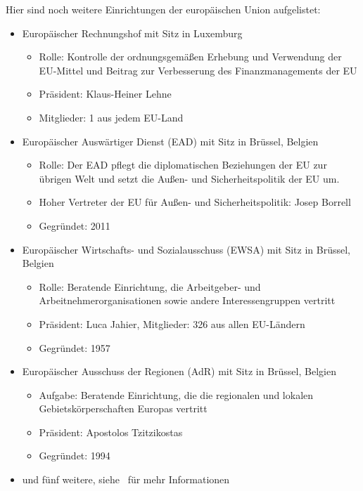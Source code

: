 Hier sind noch weitere Einrichtungen der europäischen Union aufgelistet:
\begin{itemize}
  \item Europäischer Rechnungshof mit Sitz in Luxemburg
  \begin{itemize}
    \item Rolle: Kontrolle der ordnungsgemäßen Erhebung und Verwendung der EU-Mittel und Beitrag zur Verbesserung des Finanzmanagements der EU
    \item Präsident: Klaus-Heiner Lehne
    \item Mitglieder: 1 aus jedem EU-Land
  \end{itemize}
  \item Europäischer Auswärtiger Dienst (EAD) mit Sitz in Brüssel, Belgien
  \begin{itemize}
    \item Rolle: Der EAD pflegt die diplomatischen Beziehungen der EU zur übrigen Welt und setzt die Außen- und Sicherheitspolitik der EU um.
    \item Hoher Vertreter der EU für Außen- und Sicherheitspolitik: Josep Borrell
    \item Gegründet: 2011
  \end{itemize}
  \item Europäischer Wirtschafts- und Sozialausschuss (EWSA) mit Sitz in Brüssel, Belgien
  \begin{itemize}
    \item Rolle: Beratende Einrichtung, die Arbeitgeber- und Arbeitnehmerorganisationen sowie andere Interessengruppen vertritt
    \item Präsident: Luca Jahier, Mitglieder: 326 aus allen EU-Ländern
    \item Gegründet: 1957
  \end{itemize}
  \item Europäischer Ausschuss der Regionen (AdR) mit Sitz in Brüssel, Belgien
  \begin{itemize}
    \item Aufgabe: Beratende Einrichtung, die die regionalen und lokalen Gebietskörperschaften Europas vertritt
    \item Präsident: Apostolos Tzitzikostas
    \item Gegründet: 1994
  \end{itemize}
  \item und fünf weitere, siehe~\cite{euroInstitution} für mehr Informationen
\end{itemize}